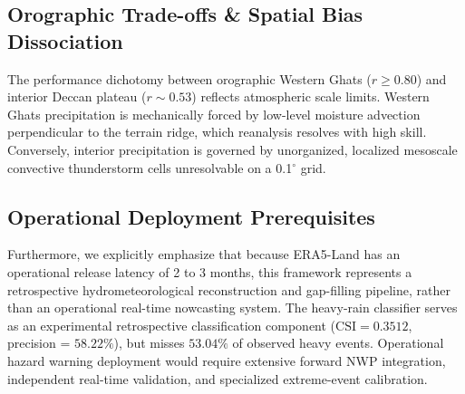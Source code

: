\documentclass[pdflatex,sn-mathphys,Numbered]{sn-jnl}
\begin{document}
\subsection{Orographic Trade-offs \& Spatial Bias Dissociation}
The performance dichotomy between orographic Western Ghats ($r \ge 0.80$) and interior Deccan plateau ($r \sim 0.53$) reflects atmospheric scale limits. Western Ghats precipitation is mechanically forced by low-level moisture advection perpendicular to the terrain ridge, which reanalysis resolves with high skill. Conversely, interior precipitation is governed by unorganized, localized mesoscale convective thunderstorm cells unresolvable on a 0.1$^\circ$ grid.

\subsection{Operational Deployment Prerequisites}
Furthermore, we explicitly emphasize that because ERA5-Land has an operational release latency of 2 to 3 months, this framework represents a retrospective hydrometeorological reconstruction and gap-filling pipeline, rather than an operational real-time nowcasting system. The heavy-rain classifier serves as an experimental retrospective classification component ($\text{CSI} = 0.3512$, precision = $58.22\%$), but misses $53.04\%$ of observed heavy events. Operational hazard warning deployment would require extensive forward NWP integration, independent real-time validation, and specialized extreme-event calibration.
\end{document}
